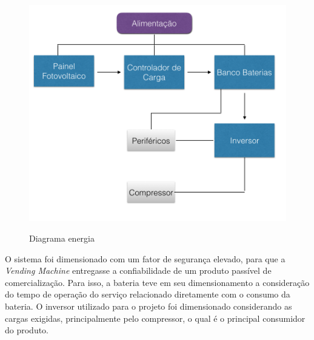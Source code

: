   \begin{figure}[H]
	\centering
    
    \includegraphics[scale=0.8]{figuras/diagrama_energia}
    \label{fig:diagrama_energia}
    \caption{Diagrama energia}
\end{figure}
	O sistema foi dimensionado com um fator de segurança elevado, para que a \textit{Vending Machine} entregasse a confiabilidade de um produto passível de comercialização. Para isso, a bateria teve em seu dimensionamento a consideração do tempo de operação do serviço relacionado diretamente com o consumo da bateria. O inversor utilizado para o projeto foi dimensionado considerando as cargas exigidas, principalmente pelo compressor, o qual é o principal consumidor do produto. 